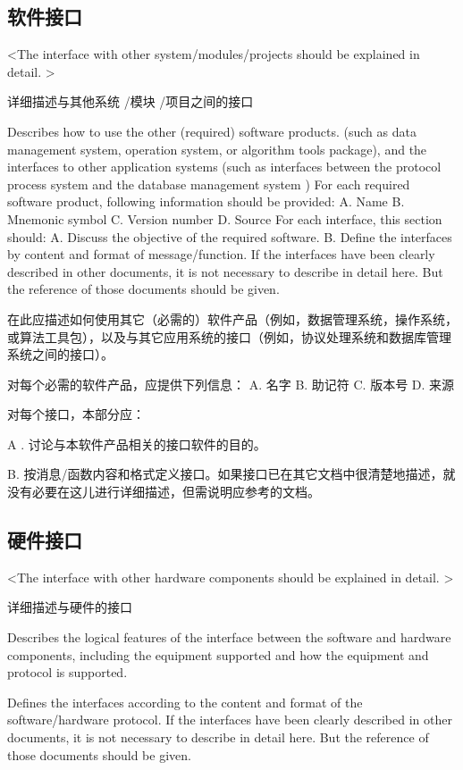\begin{itemize}
\subsection{软件接口}
<The interface with other system/modules/projects should be explained in detail. >

详细描述与其他系统 /模块 /项目之间的接口

Describes how to use the other (required) software products. (such as data management system, operation system, or algorithm tools package), and the interfaces to other application systems (such as interfaces between the protocol process system and the database management system )
For each required software product, following information should be provided:
A. Name
B. Mnemonic symbol
C. Version number
D. Source
For each interface, this section should:
A. Discuss the objective of the required software.
B. Define the interfaces by content and format of message/function. If the interfaces have been clearly described in other documents, it is not necessary to describe in detail here. But the reference of those documents should be given.

在此应描述如何使用其它（必需的）软件产品（例如，数据管理系统，操作系统，或算法工具包），以及与其它应用系统的接口（例如，协议处理系统和数据库管理系统之间的接口）。

对每个必需的软件产品，应提供下列信息：
A.	名字
B.	助记符
C.	版本号
D.	来源

对每个接口，本部分应：

A .	讨论与本软件产品相关的接口软件的目的。

B.	按消息/函数内容和格式定义接口。如果接口已在其它文档中很清楚地描述，就没有必要在这儿进行详细描述，但需说明应参考的文档。

\subsection{硬件接口}
<The interface with other hardware components should be explained in detail. >

详细描述与硬件的接口

Describes the logical features of the interface between the software and hardware components, including the equipment supported and how the equipment and protocol is supported. 

Defines the interfaces according to the content and format of the software/hardware protocol. If the interfaces have been clearly described in other documents, it is not necessary to describe in detail here. But the reference of those documents should be given.


\end{itemize}
